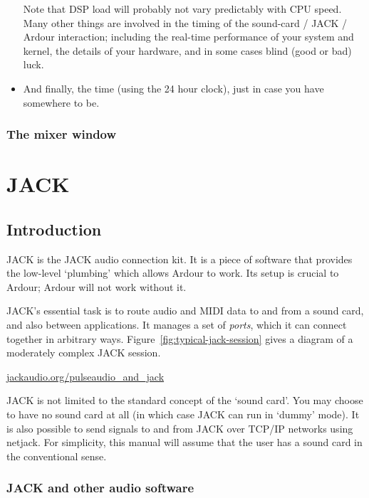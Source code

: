 \documentclass[10pt,a4paper]{book}
\begin{document}
\begin{itemize}
\begin{ddanger}
Note that DSP load will probably not vary predictably with CPU speed.
Many other things are involved in the timing of the sound-card / JACK
/ Ardour interaction; including the real-time performance of your
system and kernel, the details of your hardware, and in some cases
blind (good or bad) luck.
\end{ddanger}

\item And finally, the time (using the 24 hour clock), just in case
  you have somewhere to be.
\end{itemize}

\subsection{The mixer window}

\chapter{JACK}
\label{ch:jack}

\section{Introduction}

JACK is the JACK audio connection kit.  It is a piece of software that
provides the low-level `plumbing' which allows Ardour to work.  Its
setup is crucial to Ardour; Ardour will not work without it.

JACK's essential task is to route audio and MIDI data to and from a
sound card, and also between applications.  It manages a set of
\emph{ports}, which it can connect together in arbitrary ways.
Figure~\ref{fig:typical-jack-session} gives a diagram of a moderately
complex JACK session.

\url{jackaudio.org/pulseaudio_and_jack}

\begin{danger}
JACK is not limited to the standard concept of the `sound card'.  You
may choose to have no sound card at all (in which case JACK can run in
`dummy' mode).  It is also possible to send signals to and from JACK
over TCP/IP networks using netjack.  For simplicity, this manual will
assume that the user has a sound card in the conventional sense.
\end{danger}

\subsection{JACK and other audio software}
\end{document}

